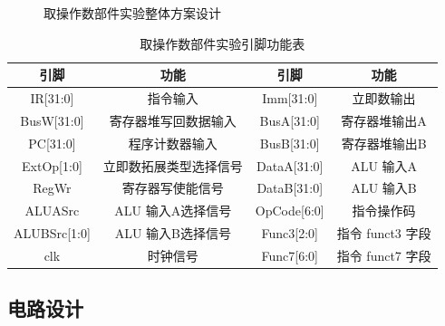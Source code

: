 \documentclass[12pt, a4paper]{ctexart}
\begin{document}
\begin{figure}[H]
    \centering
    \caption{取操作数部件实验整体方案设计}
\end{figure}

\begin{table}[H]
    \centering
    \begin{tabular}{|c|c|c|c|}
        \hline
        引脚 & 功能 & 引脚 & 功能 \\
        \hline
        IR[31:0] & 指令输入 & Imm[31:0] & 立即数输出 \\
        BusW[31:0] & 寄存器堆写回数据输入 & BusA[31:0] & 寄存器堆输出A \\
        PC[31:0] & 程序计数器输入 & BusB[31:0] & 寄存器堆输出B \\
        ExtOp[1:0] & 立即数拓展类型选择信号 & DataA[31:0] & ALU 输入A \\
        RegWr & 寄存器写使能信号 & DataB[31:0] & ALU 输入B \\
        ALUASrc & ALU 输入A选择信号 & OpCode[6:0] & 指令操作码 \\
        ALUBSrc[1:0] & ALU 输入B选择信号 & Func3[2:0] & 指令 funct3 字段 \\
        clk & 时钟信号 & Func7[6:0] & 指令 funct7 字段 \\
        \hline
    \end{tabular}
    \caption{取操作数部件实验引脚功能表}
\end{table}

\subsection{电路设计}
\end{document}
